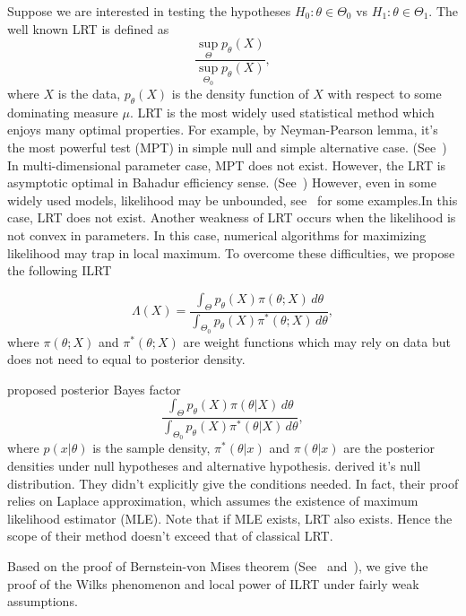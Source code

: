 \documentclass[review]{elsarticle}
\begin{document}
Suppose we are interested in  testing the hypotheses $H_0:\theta\in \Theta_0$ vs $H_1:\theta\in \Theta_1$. The well known LRT is defined as
\begin{equation}
    \frac{\sup_{\Theta} p_{\theta}(X)}{\sup_{\Theta_0} p_\theta(X)},
\end{equation}
where $X$ is the data, $p_\theta(X)$ is the density function of $X$ with respect to some dominating measure $\mu$.
LRT is the most widely used statistical method which enjoys many optimal properties. For example, by Neyman-Pearson lemma, it's the most powerful test (MPT) in simple null and simple alternative case.
(See~\cite{Lehmann}) In multi-dimensional parameter case, MPT does not exist. However, the LRT is asymptotic optimal in Bahadur efficiency sense. (See~\cite{MR0315820}) However, even in some widely used models, likelihood may be unbounded, see~\cite{Cam1990Maximum} for some examples.In this case,
LRT does not exist. Another weakness of LRT occurs when the likelihood is not convex in parameters. In this case, numerical algorithms for maximizing likelihood may trap in local maximum. 
To overcome these difficulties, we propose the following ILRT 

\begin{equation}
    \Lambda (X)=\frac{\int_{\Theta} p_\theta(X)\pi(\theta;X)\,d\theta}{\int_{\Theta_0} p_\theta(X)\pi^*(\theta;X)\,d\theta},
\end{equation}
where $\pi(\theta;X)$ and $\pi^*(\theta;X)$ are weight functions which may rely on data but does not need to equal to posterior density.


\cite{Aitkin1991Posterior} proposed posterior Bayes factor
\begin{equation}
    \frac{\int_{\Theta} p_\theta(X)\pi(\theta|X)\, d\theta}{\int_{\Theta_0}p_\theta(X)\pi^*(\theta|X)\, d\theta},
\end{equation}
where $p(x|\theta)$ is the sample density, $\pi^*(\theta|x)$ and $\pi(\theta|x)$ are the posterior densities under null hypotheses and alternative hypothesis.
\cite{gelfand1993bayesian} derived it's null distribution. They didn't explicitly give the conditions needed. In fact, their proof relies on Laplace approximation, which assumes the existence of maximum likelihood estimator (MLE). 
Note that if MLE exists, LRT also exists. Hence the scope of their method doesn't exceed that of classical LRT\@.



Based on the proof of Bernstein-von Mises theorem (See~\cite{van2000asymptotic} and~\cite{Kleijn2012The}), we give the proof of the Wilks phenomenon and local power of ILRT under fairly weak assumptions.
\end{document}
